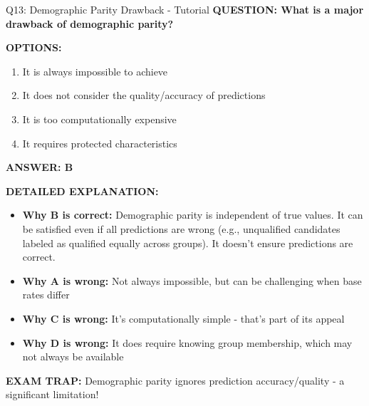 \documentclass[8pt]{beamer}
\begin{document}
	\begin{frame}{Q13: Demographic Parity Drawback - Tutorial}
		\fontsize{6.5}{7.5}\selectfont
		\textbf{QUESTION: What is a major drawback of demographic parity?}
		
		\vspace{0.1cm}
		\textbf{OPTIONS:}
		\begin{enumerate}
			\item It is always impossible to achieve
			\item It does not consider the quality/accuracy of predictions
			\item It is too computationally expensive
			\item It requires protected characteristics
		\end{enumerate}
		
		\vspace{0.1cm}
		\textcolor{myblue}{\textbf{ANSWER: B}}
		
		\vspace{0.1cm}
		\textbf{DETAILED EXPLANATION:}
		\begin{itemize}
			\item \textbf{Why B is correct:} Demographic parity is independent of true values. It can be satisfied even if all predictions are wrong (e.g., unqualified candidates labeled as qualified equally across groups). It doesn't ensure predictions are correct.
			\item \textbf{Why A is wrong:} Not always impossible, but can be challenging when base rates differ
			\item \textbf{Why C is wrong:} It's computationally simple - that's part of its appeal
			\item \textbf{Why D is wrong:} It does require knowing group membership, which may not always be available
		\end{itemize}
		
		\textcolor{myred}{\textbf{EXAM TRAP:}} Demographic parity ignores \textcolor{myblue}{prediction accuracy/quality} - a significant limitation!
	\end{frame}
	
\end{document}
